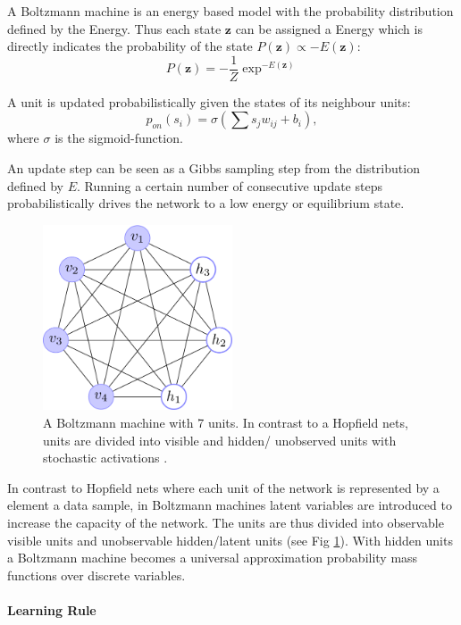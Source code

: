 A Boltzmann machine is an energy based model with the probability distribution defined by the Energy.
Thus each state $\textbf{z}$ can be assigned a Energy which is directly indicates the probability of the state $P(\textbf{z}) \propto -E(\textbf{z})$:
\[
P(\textbf{z}) = - \frac{1}{Z} \exp^{-E(\textbf{z})} 
\]

A unit is updated probabilistically given the states of its neighbour units:
\[
p_{on}(s_i) = \sigma( \sum s_j w_{ij} + b_i ), 
\]
where $\sigma$ is the sigmoid-function.

An update step can be seen as a Gibbs sampling step from the distribution defined by $E$.
Running a certain number of consecutive update steps probabilistically drives the network to a low energy or equilibrium state.


\begin{figure}
	\centering
    	\includegraphics[width=0.5\textwidth]{imgs/bm.png} 
    \caption{A Boltzmann machine with 7 units. In contrast to a Hopfield nets, units are divided into visible and hidden/ unobserved units with stochastic activations \cite{boltzImg}.}
	\label{fig:bm}
\end{figure}

In contrast to Hopfield nets where each unit of the network is represented by a element a data sample, in Boltzmann machines latent variables are introduced to increase the capacity of the network.
The units are thus divided into observable visible units and unobservable hidden/latent units (see Fig \ref{fig:bm}).
With hidden units a Boltzmann machine becomes a universal approximation probability mass functions over discrete variables.


\paragraph{Learning Rule} \label{c:cd}

